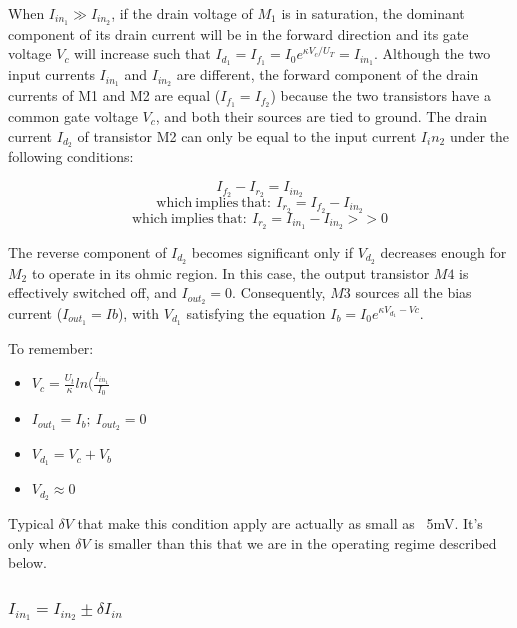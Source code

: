 When $I_{in_1} \gg I_{in_2}$, if the drain voltage of $M_1$ is in saturation, the dominant component of its drain current will be in the forward direction and its gate voltage $V_c$ will increase such that $I_d_1 = I_f_1 = I_0e^{\kappa V_c/U_T} = I_{in_1}$.  Although the two input currents $I_{in_1}$ and $I_{in_2}$ are different, the forward component of the drain currents of M1 and M2 are equal ($I_{f_1}= I_{f_2}$) because the two transistors
have a common gate voltage $V_c$, and both their sources are tied to ground. The drain current $I_d_2$ of transistor M2 can only be equal to the input current $I_in_2$ under the following conditions:

\begin{equation}
    I_f_2 - I_r_2 = I_{in_2}
\end{equation}
\begin{equation}
    \mathrm{which \ implies \ that: \ }I_r_2 = I_f_2 - I_{in_2}
\end{equation}
\begin{equation}
    \mathrm{which \ implies \ that: \ }I_r_2 = I_{in_1} - I_{in_2} >> 0
\end{equation}

The reverse component of $I_d_2$ becomes significant only if $V_d_2$ decreases
enough for $M_2$ to operate in its ohmic region. In this case, the output transistor $M4$ is effectively switched off, and $I_{out_2} = 0$. Consequently,
$M3$ sources all the bias current ($I_{out_1} = Ib$), with $V_d_1$ satisfying the equation $I_b = I_0e^{\kappa V_d_1 - Vc}$. 

To remember: 

\begin{itemize}
    \item $V_c = \frac{U_t}{\kappa}ln(\frac{I_{in}_1}{I_0}$
    \item $I_{out}_1 = I_b; \ I_{out}_2 = 0$
    \item $V_d_1 = V_c + V_b$
    \item $V_d_2 \approx 0$
\end{itemize}

Typical $\delta V$ that make this condition apply are actually as small as ~5mV. It's only when $\delta V$ is smaller than this that we are in the operating regime described below.  

\subsubsection{$I_{in_1} = I_{in_2} \pm \delta I_{in}$}

